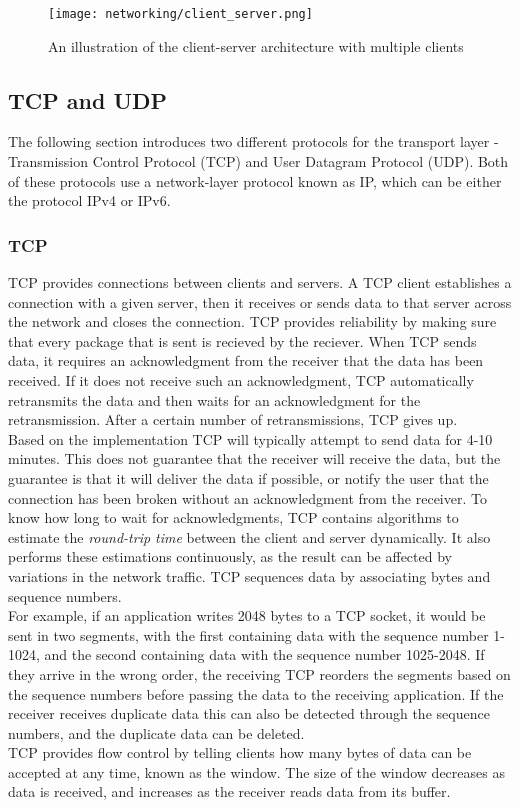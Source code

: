 \begin{figure}[H]
    \centering
    \texttt{[image: networking/client\_server.png]}
    \caption{An illustration of the client-server architecture with multiple clients}
    \label{fig:client-server}
\end{figure}


\subsection{TCP and UDP}\label{sec:tcp-udp}
The following section introduces two different protocols for the transport layer - Transmission Control Protocol (TCP) and User Datagram Protocol (UDP).
Both of these protocols use a network-layer protocol known as IP, which can be either the protocol IPv4 or IPv6.

\subsubsection{TCP}
TCP provides connections between clients and servers.
A TCP client establishes a connection with a given server, then it receives or sends data to that server across the network and closes the connection.
TCP provides reliability by making sure that every package that is sent is recieved by the reciever.
When TCP sends data, it requires an acknowledgment from the receiver that the data has been received.
If it does not receive such an acknowledgment, TCP automatically retransmits the data and then waits for an acknowledgment for the retransmission.
After a certain number of retransmissions, TCP gives up.\\
Based on the implementation TCP will typically attempt to send data for 4-10 minutes.
This does not guarantee that the receiver will receive the data, but the guarantee is that it will deliver the data if possible, or notify the user that the connection has been broken without an acknowledgment from the receiver.
To know how long to wait for acknowledgments, TCP contains algorithms to estimate the \textit{round-trip time} between the client and server dynamically.
It also performs these estimations continuously, as the result can be affected by variations in the network traffic.
TCP sequences data by associating bytes and sequence numbers.\\
For example, if an application writes 2048 bytes to a TCP socket, it would be sent in two segments, with the first containing data with the sequence number 1-1024, and the second containing data with the sequence number 1025-2048.
If they arrive in the wrong order, the receiving TCP reorders the segments based on the sequence numbers before passing the data to the receiving application.
If the receiver receives duplicate data this can also be detected through the sequence numbers, and the duplicate data can be deleted.\\
TCP provides flow control by telling clients how many bytes of data can be accepted at any time, known as the window.
The size of the window decreases as data is received, and increases as the receiver reads data from its buffer.

